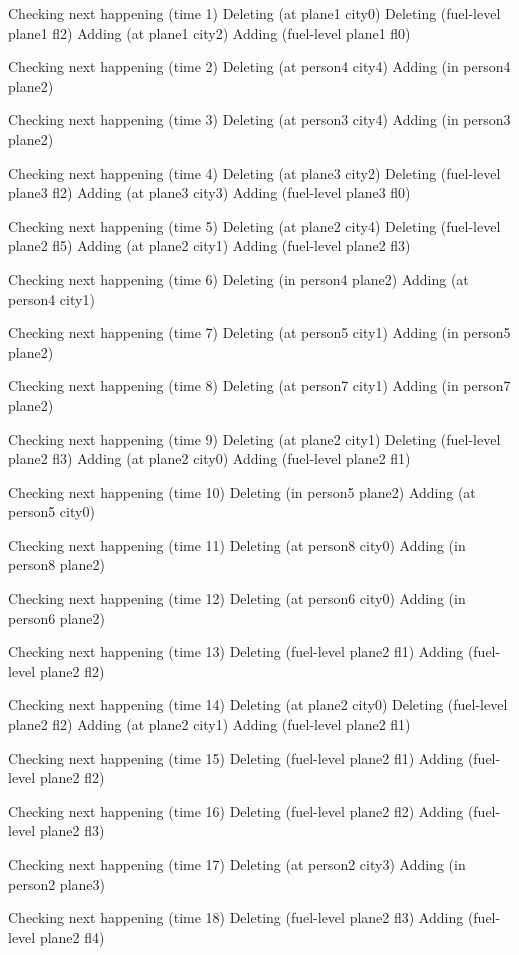 Checking next happening (time 1)
Deleting (at plane1 city0)
Deleting (fuel-level plane1 fl2)
Adding (at plane1 city2)
Adding (fuel-level plane1 fl0)

Checking next happening (time 2)
Deleting (at person4 city4)
Adding (in person4 plane2)

Checking next happening (time 3)
Deleting (at person3 city4)
Adding (in person3 plane2)

Checking next happening (time 4)
Deleting (at plane3 city2)
Deleting (fuel-level plane3 fl2)
Adding (at plane3 city3)
Adding (fuel-level plane3 fl0)

Checking next happening (time 5)
Deleting (at plane2 city4)
Deleting (fuel-level plane2 fl5)
Adding (at plane2 city1)
Adding (fuel-level plane2 fl3)

Checking next happening (time 6)
Deleting (in person4 plane2)
Adding (at person4 city1)

Checking next happening (time 7)
Deleting (at person5 city1)
Adding (in person5 plane2)

Checking next happening (time 8)
Deleting (at person7 city1)
Adding (in person7 plane2)

Checking next happening (time 9)
Deleting (at plane2 city1)
Deleting (fuel-level plane2 fl3)
Adding (at plane2 city0)
Adding (fuel-level plane2 fl1)

Checking next happening (time 10)
Deleting (in person5 plane2)
Adding (at person5 city0)

Checking next happening (time 11)
Deleting (at person8 city0)
Adding (in person8 plane2)

Checking next happening (time 12)
Deleting (at person6 city0)
Adding (in person6 plane2)

Checking next happening (time 13)
Deleting (fuel-level plane2 fl1)
Adding (fuel-level plane2 fl2)

Checking next happening (time 14)
Deleting (at plane2 city0)
Deleting (fuel-level plane2 fl2)
Adding (at plane2 city1)
Adding (fuel-level plane2 fl1)

Checking next happening (time 15)
Deleting (fuel-level plane2 fl1)
Adding (fuel-level plane2 fl2)

Checking next happening (time 16)
Deleting (fuel-level plane2 fl2)
Adding (fuel-level plane2 fl3)

Checking next happening (time 17)
Deleting (at person2 city3)
Adding (in person2 plane3)

Checking next happening (time 18)
Deleting (fuel-level plane2 fl3)
Adding (fuel-level plane2 fl4)

